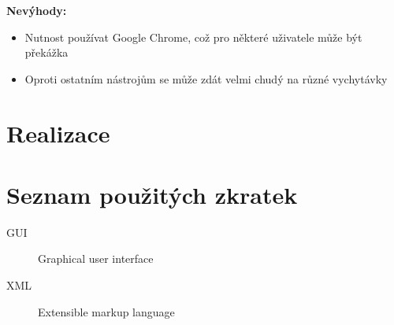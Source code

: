 \documentclass[thesis=B,czech]{FITthesis}[2012/06/26]
\begin{document}
\textbf{Nevýhody:}
\begin{itemize}
	\item Nutnost používat Google Chrome, což pro některé uživatele může být překážka
	\item Oproti ostatním nástrojům se může zdát velmi chudý na různé vychytávky
\end{itemize}



\chapter{Realizace}


\begin{conclusion}
\end{conclusion}




\appendix


\chapter{Seznam použitých zkratek}
\begin{description}
	\item[GUI] Graphical user interface
	\item[XML] Extensible markup language
\end{description}
\end{document}
